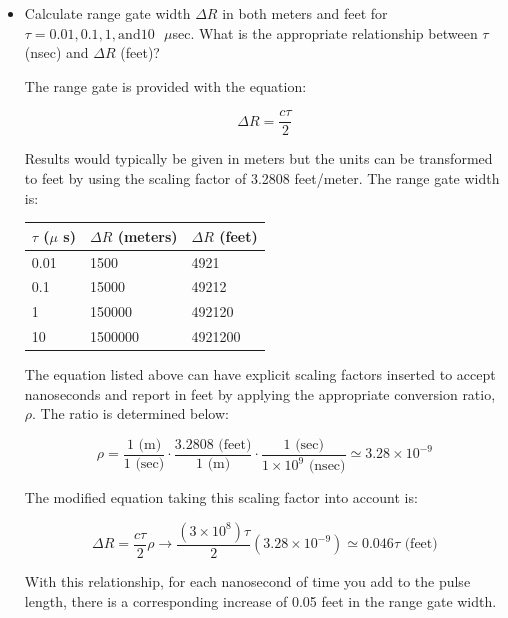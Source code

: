 \documentclass[letterpaper,10pt]{article}\usepackage[]{graphicx}\usepackage[]{color}
\newcommand{\question}[3]{
\begin{itemize}
\item[{\makebox[1cm]{#1)}}] #2

\vspace{.2in}

#3

\end{itemize}

\vspace{.2in}
}
\begin{document}
\question{1.5}{Calculate range gate width $\Delta R$ in both meters and feet for $\tau=0.01, 0.1, 1, \text{and} 10 \text{ } \mu$sec. What is the appropriate relationship between $\tau$ (nsec) and $\Delta R$ (feet)?}
{


The range gate is provided with the equation:

\begin{equation*}
\Delta R = \frac{c\tau}{2}
\end{equation*}




Results would typically be given in meters but the units can be transformed to feet by using the scaling factor of 3.2808 feet/meter.  The range gate width is:

\begin{center}
\begin{tabular}{l|ll} \hline
$\tau$ ($\mu$ s) & $\Delta R$ (meters) & $\Delta R$ (feet) \\ \hline
0.01 & 1500 & 4921 \\
0.1 & 15000 & 49212 \\
1 & 150000 & 492120 \\
10 & 1500000 & 4921200 \\
\end{tabular}
\end{center}

The equation listed above can have explicit scaling factors inserted to accept nanoseconds and report in feet by applying the appropriate conversion ratio, $\rho$.  The ratio is determined below:

\begin{equation*}
\rho = \frac{1 \text{ (m)}}{1 \text{ (sec)}}\cdot\frac{3.2808 \text{ (feet)}}{1 \text{ (m)}}\cdot\frac{1 \text{ (sec)}}{1\times 10^9 \text{ (nsec)}} \simeq 3.28\times 10^{-9}
\end{equation*}

The modified equation taking this scaling factor into account is:

\begin{equation*}
\Delta R = \frac{c\tau}{2}\rho \rightarrow \frac{\left(3\times 10^8\right)\tau}{2}\left(3.28\times 10^{-9}\right) \simeq 0.046\tau \text{ (feet)}
\end{equation*}

With this relationship, for each nanosecond of time you add to the pulse length, there is a corresponding increase of 0.05 feet in the range gate width.

}
\end{document}
